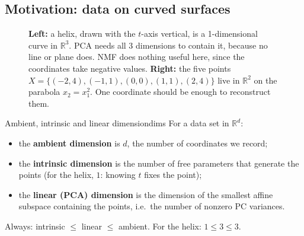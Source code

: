 \documentclass[11pt]{article}
\newcommand{\R}{\mathbb{R}}
\begin{document}
\subsection{Motivation: data on curved surfaces}

\begin{figure}[htbp]
\centering
{}
\caption{\textbf{Left:} a helix, drawn with the $t$-axis vertical, is a 1-dimensional curve in $\R^3$. PCA
needs all 3 dimensions to contain it, because no line or plane does. NMF does nothing useful here, since the
coordinates take negative values. \textbf{Right:} the five points $X=\{(-2,4),(-1,1),(0,0),(1,1),(2,4)\}$
live in $\R^2$ on the parabola $x_2=x_1^2$. One coordinate should be enough to reconstruct them.}
\end{figure}

\begin{definition}{Ambient, intrinsic and linear dimension}{dims}
For a data set in $\R^d$:
\begin{itemize}[nosep]
\item the \textbf{ambient dimension} is $d$, the number of coordinates we record;
\item the \textbf{intrinsic dimension} is the number of free parameters that generate the points
(for the helix, $1$: knowing $t$ fixes the point);
\item the \textbf{linear (PCA) dimension} is the dimension of the smallest affine subspace containing
the points, i.e.\ the number of nonzero PC variances.
\end{itemize}
Always: intrinsic $\le$ linear $\le$ ambient. For the helix: $1\le 3\le 3$.
\end{definition}
\end{document}
